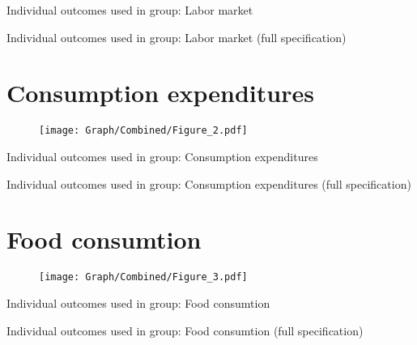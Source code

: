 \documentclass[10pt,a4paper]{article}
\begin{document}
\begin{table}[H]\centering\caption{Individual outcomes used in group: Labor market }
\resizebox{\textwidth}{!}{}
\end{table}
\begin{table}[H]\centering\caption{Individual outcomes used in group: Labor market (full specification)}
\resizebox{\textwidth}{!}{}
\end{table}
\pagebreak
\section{Consumption expenditures}
\begin{table}[H]\centering

\end{table}
\begin{figure}[H]\centering
\texttt{[image: Graph/Combined/Figure\_2.pdf]}
\caption{} \label{fig:Fig_2}
\end{figure}

\begin{table}[H]\centering\caption{Individual outcomes used in group: Consumption expenditures }
\resizebox{\textwidth}{!}{}
\end{table}
\begin{table}[H]\centering\caption{Individual outcomes used in group: Consumption expenditures (full specification)}
\resizebox{\textwidth}{!}{}
\end{table}
\pagebreak
\section{Food consumtion}
\begin{table}[H]\centering

\end{table}
\begin{figure}[H]\centering
\texttt{[image: Graph/Combined/Figure\_3.pdf]}
\caption{} \label{fig:Fig_3}
\end{figure}

\begin{table}[H]\centering\caption{Individual outcomes used in group: Food consumtion }
\resizebox{\textwidth}{!}{}
\end{table}
\begin{table}[H]\centering\caption{Individual outcomes used in group: Food consumtion (full specification)}
\resizebox{\textwidth}{!}{}
\end{table}
\pagebreak
\end{document}
